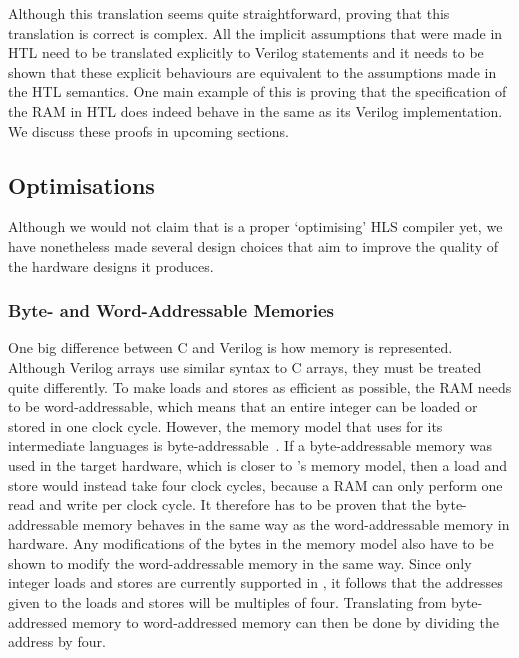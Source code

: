 Although this translation seems quite straight\-forward, proving that this translation is correct is complex.
All the implicit assumptions that were made in HTL need to be translated explicitly to Verilog statements and it needs to be shown that these explicit behaviours are equivalent to the assumptions made in the HTL semantics.  One main example of this is proving that the specification of the RAM in HTL does indeed behave in the same as its Verilog implementation.
We discuss these proofs in upcoming sections.


\subsection{Optimisations}

Although we would not claim that \vericert{} is a proper `optimising' HLS compiler yet, we have nonetheless made several design choices that aim to improve the quality of the hardware designs it produces.

\subsubsection{Byte- and Word-Addressable Memories}

One big difference between C and Verilog is how memory is represented.  Although Verilog arrays use similar syntax to C arrays, they must be treated quite differently. To make loads and stores as efficient as possible, the RAM needs to be word-addressable, which means that an entire integer can be loaded or stored in one clock cycle.
However, the memory model that \compcert{} uses for its intermediate languages is byte-addre\-ssa\-ble~\cite{blazy05_formal_verif_memor_model_c}.  If a byte-addressable memory was used in the target hardware, which is closer to \compcert{}'s memory model, then a load and store would instead take four clock cycles, because a RAM can only perform one read and write per clock cycle.  It therefore has to be proven that the byte-addressable memory behaves in the same way as the word-addressable memory in hardware.  Any modifications of the bytes in the \compcert{} memory model also have to be shown to modify the word-addressable memory in the same way.  Since only integer loads and stores are currently supported in \vericert{}, it follows that the addresses given to the loads and stores will be multiples of four.  Translating from byte-addressed memory to word-addressed memory can then be done by dividing the address by four.

